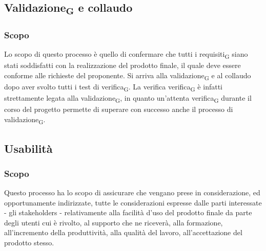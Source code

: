 \subsection{Validazione\textsubscript{G} e collaudo}
\subsubsection{Scopo}
Lo scopo di questo processo è quello di confermare che tutti i requisiti\textsubscript{G} siano stati soddisfatti con la realizzazione del prodotto finale, il quale deve essere conforme alle richieste del proponente. Si arriva alla validazione\textsubscript{G} e al collaudo dopo aver svolto tutti i test di verifica\textsubscript{G}. La verifica verifica\textsubscript{G} è infatti strettamente legata alla validazione\textsubscript{G}, in quanto un'attenta verifica\textsubscript{G} durante il corso del progetto permette di superare con successo anche il processo di validazione\textsubscript{G}.

\subsection{Usabilità}
\subsubsection{Scopo}
Questo processo ha lo scopo di assicurare che vengano prese in considerazione, ed  opportunamente indirizzate, tutte le considerazioni espresse dalle parti interessate - gli stakeholders - relativamente alla facilità d'uso del prodotto finale da parte degli utenti cui è rivolto, al supporto che ne riceverà, alla formazione, all'incremento della produttività, alla qualità del lavoro, all'accettazione del prodotto stesso. 



